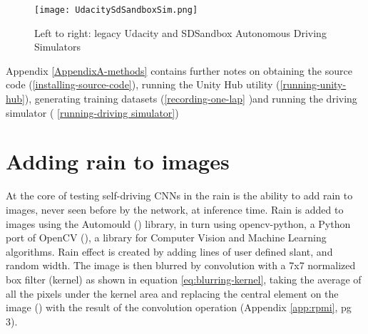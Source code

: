 \begin{figure}[h!]
\centering
\texttt{[image: UdacitySdSandboxSim.png]}
\caption{Left to right: legacy Udacity and SDSandbox Autonomous Driving Simulators}
\label{fig:UdacitySdSandboxAutonomous}
\end{figure}

Appendix \ref{AppendixA-methods} contains further notes on obtaining the source code (\ref{installing-source-code}), running the Unity Hub utility (\ref{running-unity-hub}), generating training datasets (\ref{recording-one-lap} )and running the driving simulator (
\ref{running-driving simulator})






\section{Adding rain to images}
\label{methods:AddingRainToImages}
At the core of testing self-driving CNNs in the rain is the ability to add rain to images, never seen before by the network, at inference time.
Rain is added to images using the Automould (\cite{Saxena2017}) library, in turn using opencv-python, a Python port of OpenCV (\cite{mordvintsev2014opencv}), a library for Computer Vision and Machine Learning algorithms. Rain effect is created by adding lines of user defined slant, and random width. The image is then blurred by convolution with a 7x7 normalized box filter (kernel) as shown in equation \ref{eq:blurring-kernel}, taking the average of all the pixels under the kernel area and replacing the central element on the image (\cite{documentationOpenCV2020}) with the result of the convolution operation (Appendix \ref{app:rpmi}, pg 3).

